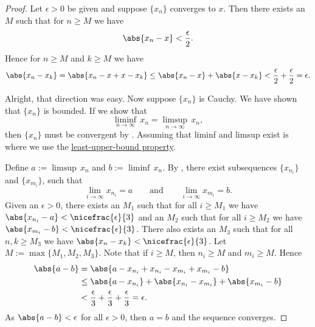 \documentclass[12pt]{book}
\begin{document}
\begin{proof}
Let $\epsilon > 0$ be given and
suppose $\{ x_n \}$ converges to $x$.
Then there 
exists an $M$ such that for $n \geq M$ we have
\begin{equation*}
\abs{x_n - x} < \frac{\epsilon}{2} .
\end{equation*}
Hence for $n \geq M$ and $k \geq M$ we have
\begin{equation*}
\abs{x_n - x_k} = 
\abs{x_n - x + x - x_k}
\leq \abs{x_n-x} + \abs{x-x_k} < \frac{\epsilon}{2} + \frac{\epsilon}{2} =
\epsilon .
\end{equation*}

Alright, that direction was easy.
Now suppose $\{ x_n \}$ is Cauchy.
We have shown that $\{ x_n \}$ is bounded.
If we show that
\begin{equation*}
\liminf_{n\to \infty} \, x_n = \limsup_{n\to\infty} \, x_n ,
\end{equation*}
then $\{ x_n \}$ must be convergent by .
Assuming that liminf and limsup exist is where we use the
\hyperref[defn:lub]{least-upper-bound property}.


Define $a := \limsup \, x_n$ and
$b := \liminf \, x_n$.
By , there exist subsequences
$\{ x_{n_i} \}$ and
$\{ x_{m_i} \}$, such that
\begin{equation*}
\lim_{i\to\infty} x_{n_i} = a
\qquad \text{and} \qquad
\lim_{i\to\infty} x_{m_i} = b.
\end{equation*}
Given an $\epsilon > 0$,
there exists an $M_1$ such that for all $i \geq M_1$
we have $\abs{x_{n_i} - a} < \nicefrac{\epsilon}{3}$ and
an $M_2$ such that for all $i \geq M_2$ we have
$\abs{x_{m_i} - b} < \nicefrac{\epsilon}{3}$.
There also exists an $M_3$
such that for all $n,k \geq M_3$ we have
$\abs{x_n-x_k} < \nicefrac{\epsilon}{3}$.
Let $M := \max \{ M_1, M_2, M_3 \}$.
Note that if $i \geq M$, then $n_i \geq M$ and $m_i \geq M$.
Hence
\begin{equation*}
\begin{split}
\abs{a-b} & =
\abs{a-x_{n_i}+x_{n_i}
-x_{m_i}+x_{m_i}
-b} \\
& \leq
\abs{a-x_{n_i}}
+ \abs{x_{n_i} -x_{m_i}}
+ \abs{x_{m_i} -b} \\
& <
\frac{\epsilon}{3}
+
\frac{\epsilon}{3}
+
\frac{\epsilon}{3}
= \epsilon .
\end{split}
\end{equation*}
As $\abs{a-b} < \epsilon$ for all $\epsilon > 0$, then $a=b$ and 
the sequence converges.
\end{proof}
\end{document}
